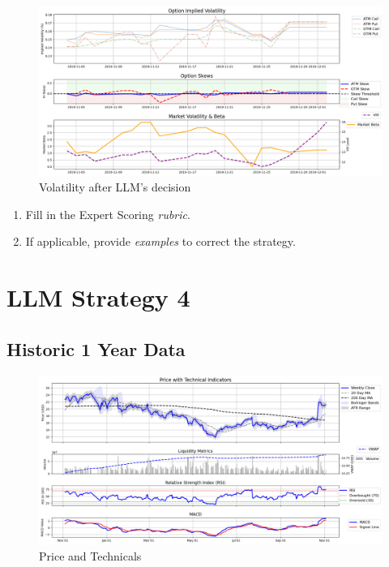 \documentclass[8pt]{scrartcl}
\begin{document}
\begin{figure}[H]
    \centering
    \includegraphics[width=1\linewidth]{judge_reviews/GOOGL_M_gpt-4o-mini/2019-11-04/llm_Market_Volatility_&_Beta.png}
    \caption{Volatility after LLM's decision}
\end{figure}

\begin{tcolorbox}[colback=blue!10, colframe=blue!60, title=\textbf{TASKS}, sharp corners=southwest]
\begin{enumerate}
    \item Fill in the Expert Scoring \textit{rubric}.
    \item If applicable, provide \textit{examples} to correct the strategy.
\end{enumerate}
\end{tcolorbox}
\newpage


\section*{LLM Strategy 4}
\label{app:s4}

\subsection*{Historic 1 Year Data}

\begin{figure}[H]
    \centering
    \includegraphics[width=1\linewidth]{judge_reviews//TSLA_M_gpt-4o-mini/2019-11-04/judge_Price_with_Technical_Indicators.png}
    \caption{Price and Technicals}
\end{figure}
\end{document}

